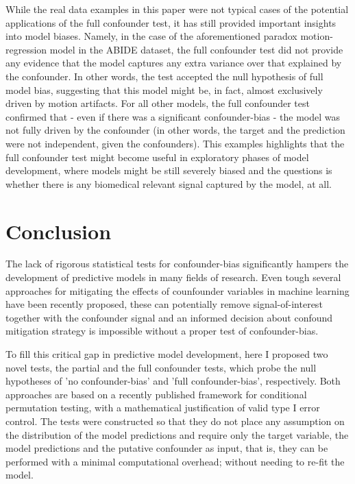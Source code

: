 \documentclass{article}
\begin{document}
While the real data examples in this paper were not typical cases of the potential applications of the full confounder test, it has still provided important insights into model biases. Namely, in the case of the aforementioned paradox motion-regression model in the ABIDE dataset, the full confounder test did not provide any evidence that the model captures any extra variance over that explained by the confounder. In other words, the test accepted the null hypothesis of full model bias, suggesting that this model might be, in fact, almost exclusively driven by motion artifacts.
For all other models, the full confounder test confirmed that - even if there was a significant confounder-bias - the model was not fully driven by the confounder (in other words, the target and the prediction were not independent, given the confounders).
This examples highlights that the full confounder test might become useful in exploratory phases of model development, where models might be still severely biased and the questions is whether there is any biomedical relevant signal captured by the model, at all.


\section{Conclusion}

The lack of rigorous statistical tests for confounder-bias significantly hampers the development of predictive models in many fields of research. Even tough several approaches for mitigating the effects of counfounder variables in machine learning have been recently proposed, these can potentially remove signal-of-interest together with the confounder signal and an informed decision about confound mitigation strategy is impossible without a proper test of confounder-bias.

To fill this critical gap in predictive model development, here I proposed two novel tests, the partial and the full confounder tests, which probe the null hypotheses of 'no confounder-bias' and 'full confounder-bias', respectively. Both approaches are based on a recently published framework for conditional permutation testing, with a mathematical justification of valid type I error control. The tests were constructed so that they do not place any assumption on the distribution of the model predictions and require only the target variable, the model predictions and the putative confounder as input, that is, they can be performed with a minimal computational overhead; without needing to re-fit the model.
\end{document}
